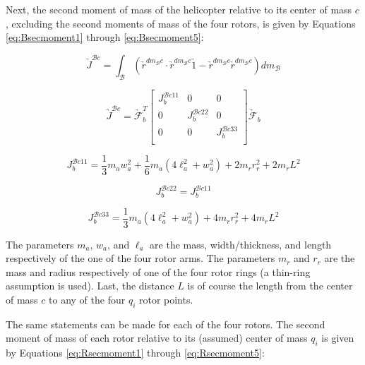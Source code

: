 \documentclass[journal]{IEEEtran}
\begin{document}
Next, the second moment of mass of the helicopter relative to its center of mass $c$, excluding the second moments of mass of the four rotors, is given by Equations \ref{eq:Bsecmoment1} through \ref{eq:Bsecmoment5}:

\begin{equation}
	\underrightarrow{J}^{\mathcal{B}c}=\int_{\mathcal{B}}^{}
	(\underrightarrow{r}^{dm_{\mathcal{B}}c}\cdot\underrightarrow{r}^{dm_{\mathcal{B}}c}\underrightarrow{1}- \underrightarrow{r}^{dm_{\mathcal{B}}c}\underrightarrow{r}^{dm_{\mathcal{B}}c})dm_{\mathcal{B}}
	\label{eq:Bsecmoment1}
\end{equation} 

\begin{equation}
	\underrightarrow{J}^{\mathcal{B}c}=\underrightarrow{\mathcal{F}}^T_b\left[ \begin{array}{ccc}
					J^{\mathcal{B}c11}_b & 0 & 0\\
					0 & J^{\mathcal{B}c22}_b & 0\\
					0 & 0 & J^{\mathcal{B}c33}_b\\
					\end{array} \right]\underrightarrow{\mathcal{F}}_b
	\label{eq:Bsecmoment2}
\end{equation} 

\begin{equation}
	J^{\mathcal{B}c11}_b=\frac{1}{3}m_aw^2_a+\frac{1}{6}m_a(4\ell^2_a+w^2_a)+2m_rr^2_r+2m_rL^2
	\label{eq:Bsecmoment3}
\end{equation} 

\begin{equation}
	J^{\mathcal{B}c22}_b=J^{\mathcal{B}c11}_b
	\label{eq:Bsecmoment4}
\end{equation} 

\begin{equation}
	J^{\mathcal{B}c33}_b=\frac{1}{3}m_a(4\ell^2_a+w^2_a)+4m_rr^2_r+4m_rL^2
	\label{eq:Bsecmoment5}
\end{equation} 

The parameters $m_a$, $w_a$, and $\ell_a$ are the mass, width/thickness, and length respectively of the one of the four rotor arms. The parameters $m_r$ and $r_r$ are the mass and radius respectively of one of the four rotor rings (a thin-ring assumption is used). Last, the distance $L$ is of course the length from the center of mass $c$ to any of the four $q_i$ rotor points.   

The same statements can be made for each of the four rotors. The second moment of mass of each rotor relative to its (assumed) center of mass $q_i$ is given by Equations \ref{eq:Rsecmoment1} through \ref{eq:Rsecmoment5}:
\end{document}
